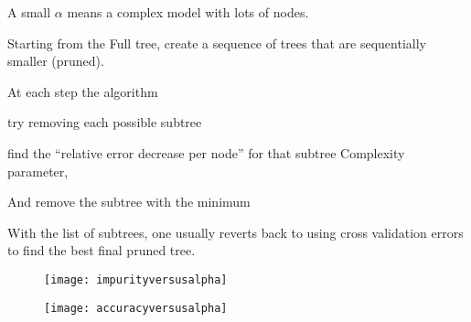 A small $\alpha$ means a complex model with lots of nodes.

	\begin{bulletedlist}
		\item Starting from the Full tree, create a sequence of trees that are sequentially smaller (pruned).
		\item At each step the algorithm
		\item try removing each possible subtree
		\item find the ``relative error decrease per node'' for that subtree Complexity parameter,
		\item And remove the subtree with the minimum
		\item With the list of subtrees, one usually reverts back to using cross validation errors to find the best final pruned tree.
	\end{bulletedlist}

	\begin{figure}[tbp]
		\begin{minipage}[t]{0.475\textwidth}
			\flushleft
			\texttt{[image: impurityversusalpha]}
		\end{minipage}
		\hfill
		\begin{minipage}[t]{0.475\textwidth}
			\flushright
			\texttt{[image: accuracyversusalpha]}
		\end{minipage}
	\end{figure}



